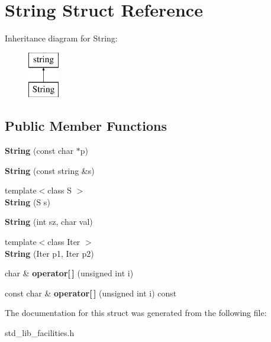 \hypertarget{struct_string}{\section{String Struct Reference}
\label{struct_string}
}
Inheritance diagram for String\-:\begin{figure}[H]
\begin{center}
\leavevmode
\includegraphics[height=2.000000cm]{struct_string}
\end{center}
\end{figure}
\subsection*{Public Member Functions}
\begin{DoxyCompactItemize}
\item 
\hypertarget{struct_string_a09ca4f1436a83ecb1c273a836b7cd4c6}{{\bfseries String} (const char $\ast$p)}\label{struct_string_a09ca4f1436a83ecb1c273a836b7cd4c6}

\item 
\hypertarget{struct_string_a883e41093b198b2bc12a45a68cfb1dc0}{{\bfseries String} (const string \&s)}\label{struct_string_a883e41093b198b2bc12a45a68cfb1dc0}

\item 
\hypertarget{struct_string_a24d7e90daf774da2c60ad58ec8b38050}{{\footnotesize template$<$class S $>$ }\\{\bfseries String} (S s)}\label{struct_string_a24d7e90daf774da2c60ad58ec8b38050}

\item 
\hypertarget{struct_string_a14aa59ca988bdfa4ca0602ba5cdd2245}{{\bfseries String} (int sz, char val)}\label{struct_string_a14aa59ca988bdfa4ca0602ba5cdd2245}

\item 
\hypertarget{struct_string_ac880812f3fa206285c26ac7af6f37c04}{{\footnotesize template$<$class Iter $>$ }\\{\bfseries String} (Iter p1, Iter p2)}\label{struct_string_ac880812f3fa206285c26ac7af6f37c04}

\item 
\hypertarget{struct_string_a688b13c2413403fcc8fbcb9a20f11160}{char \& {\bfseries operator\mbox{[}$\,$\mbox{]}} (unsigned int i)}\label{struct_string_a688b13c2413403fcc8fbcb9a20f11160}

\item 
\hypertarget{struct_string_a0b0dcaf33d13ad12c24b77712541a15e}{const char \& {\bfseries operator\mbox{[}$\,$\mbox{]}} (unsigned int i) const }\label{struct_string_a0b0dcaf33d13ad12c24b77712541a15e}

\end{DoxyCompactItemize}


The documentation for this struct was generated from the following file\-:\begin{DoxyCompactItemize}
\item 
std\-\_\-lib\-\_\-facilities.\-h\end{DoxyCompactItemize}
